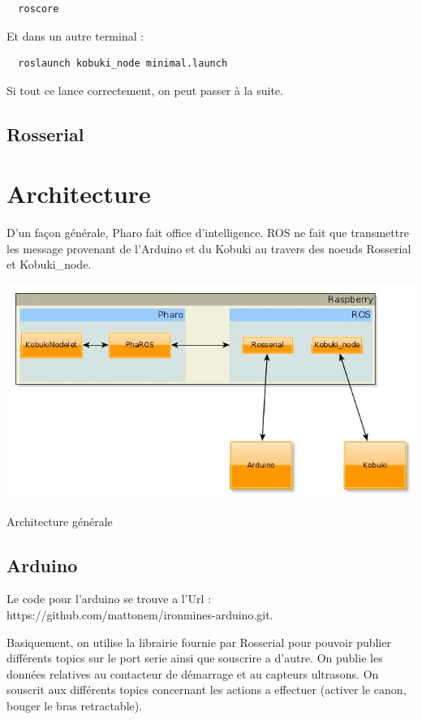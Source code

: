 \documentclass[a4paper, 11pt]{article}
\begin{document}
\begin{verbatim}
  roscore
\end{verbatim}

Et dans un autre terminal : 

\begin{verbatim}
  roslaunch kobuki_node minimal.launch
\end{verbatim}

Si tout ce lance correctement, on peut passer à la suite.

\subsection{Rosserial}
  
\section{Architecture}

D'un façon générale, Pharo fait office d'intelligence. ROS ne fait que
transmettre les message provenant de l'Arduino et du Kobuki au travers
des noeuds Rosserial et Kobuki\_node.
\begin{center}
  \includegraphics[width=\linewidth]{./architecture.jpg}
  \caption{Architecture générale}
  \label{archi_generale}
\end{center}
\subsection{Arduino}
Le code pour l'arduino se trouve a l'Url
:\\ https://github.com/mattonem/ironmines-arduino.git.

Basiquement, on utilise la librairie fournie par Rosserial pour
pouvoir publier différents topics sur le port serie ainsi que souscrire
a d'autre. On publie les données relatives au contacteur de démarrage
et au capteurs ultrasons. On souscrit aux différents topics concernant
les actions a effectuer (activer le canon, bouger le bras
retractable).
\end{document}
